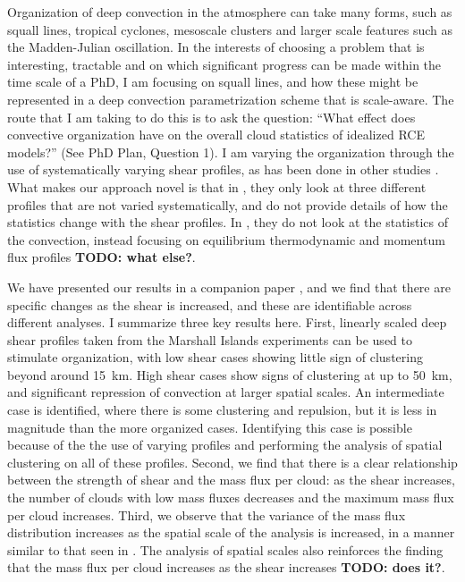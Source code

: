 \documentclass[11pt,a4paper]{article}
\newcommand\todo[1]{\textbf{TODO: #1}}
\begin{document}
Organization of deep convection in the atmosphere can take many forms, such as squall lines, tropical cyclones, mesoscale clusters and larger scale features such as the Madden-Julian oscillation. In the interests of choosing a problem that is interesting, tractable and on which significant progress can be made within the time scale of a PhD, I am focusing on squall lines, and how these might be represented in a deep convection parametrization scheme that is scale-aware. The route that I am taking to do this is to ask the question: ``What effect does convective organization have on the overall cloud statistics of idealized RCE models?'' (See PhD Plan, Question 1). I am varying the organization through the use of systematically varying shear profiles, as has been done in other studies \parencite{RE2001, cohen2006fluctuations}. What makes our approach novel is that in \cite{cohen2006fluctuations}, they only look at three different profiles that are not varied systematically, and do not provide details of how the statistics change with the shear profiles. In \cite{RE2001}, they do not look at the statistics of the convection, instead focusing on equilibrium thermodynamic and momentum flux profiles \todo{what else?}. 

We have presented our results in a companion paper \parencite{muetz2017effects}, and we find that there are specific changes as the shear is increased, and these are identifiable across different analyses. I summarize three key results here. First, linearly scaled deep shear profiles taken from the Marshall Islands experiments \cite{yanai1973determination} can be used to stimulate organization, with low shear cases showing little sign of clustering beyond around \SI{15}{km}. High shear cases show signs of clustering at up to \SI{50}{km}, and significant repression of convection at larger spatial scales. An intermediate case is identified, where there is some clustering and repulsion, but it is less in magnitude than the more organized cases. Identifying this case is possible because of the the use of varying profiles and performing the analysis of spatial clustering on all of these profiles. Second, we find that there is a clear relationship between the strength of shear and the mass flux per cloud: as the shear increases, the number of clouds with low mass fluxes decreases and the maximum mass flux per cloud increases. Third, we observe that the variance of the mass flux distribution increases as the spatial scale of the analysis is increased, in a manner similar to that seen in \cite{plant2008stochastic}. The analysis of spatial scales also reinforces the finding that the mass flux per cloud increases as the shear increases \todo{does it?}.
\end{document}
